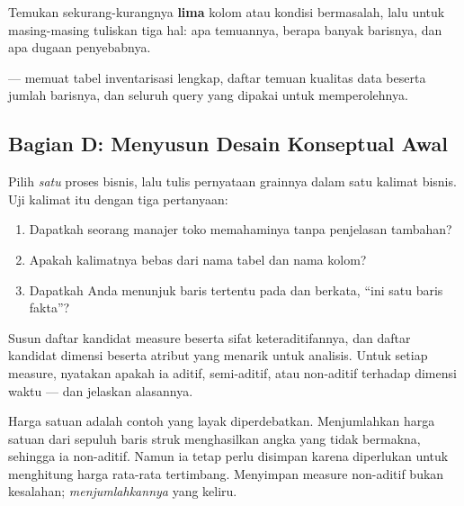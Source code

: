 Temukan sekurang-kurangnya \textbf{lima} kolom atau kondisi bermasalah, lalu
untuk masing-masing tuliskan tiga hal: apa temuannya, berapa banyak barisnya,
dan apa dugaan penyebabnya.

\begin{luaran}
 --- memuat tabel inventarisasi
lengkap, daftar temuan kualitas data beserta jumlah barisnya, dan seluruh query
yang dipakai untuk memperolehnya.
\end{luaran}

\subsection{Bagian D: Menyusun Desain Konseptual Awal}


Pilih \emph{satu} proses bisnis, lalu tulis pernyataan grainnya dalam satu
kalimat bisnis. Uji kalimat itu dengan tiga pertanyaan:

\begin{enumerate}[leftmargin=1.4em]
  \item Dapatkah seorang manajer toko memahaminya tanpa penjelasan tambahan?
  \item Apakah kalimatnya bebas dari nama tabel dan nama kolom?
  \item Dapatkah Anda menunjuk baris tertentu pada 
        dan berkata, ``ini satu baris fakta''?
\end{enumerate}


Susun daftar kandidat measure beserta sifat keteraditifannya, dan daftar
kandidat dimensi beserta atribut yang menarik untuk analisis. Untuk setiap
measure, nyatakan apakah ia aditif, semi-aditif, atau non-aditif terhadap
dimensi waktu --- dan jelaskan alasannya.

\begin{catatan}
Harga satuan adalah contoh yang layak diperdebatkan. Menjumlahkan harga satuan
dari sepuluh baris struk menghasilkan angka yang tidak bermakna, sehingga ia
non-aditif. Namun ia tetap perlu disimpan karena diperlukan untuk menghitung
harga rata-rata tertimbang. Menyimpan measure non-aditif bukan kesalahan;
\emph{menjumlahkannya} yang keliru.
\end{catatan}


